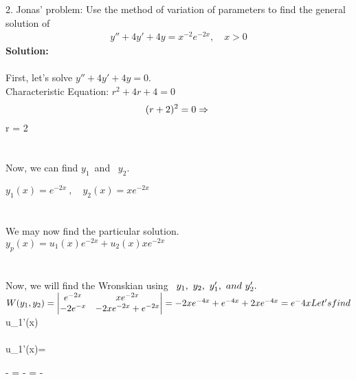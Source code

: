\documentclass{article}
\begin{document}
\hline 
\vspace{0.2in}


2. Jonas' problem: Use the method of variation of parameters to find the general solution of
\begin{align*}
y'' + 4y' + 4y = x^{-2} e^{-2x}, \quad x > 0
\end{align*}
\textbf{Solution:} 
\\ \\
First, let's solve $y'' + 4y' + 4y = 0$.\\
\noindent Characteristic Equation: $ r^2 + 4r + 4 = 0$\\
\noindent \quad \Rightarrow $$(r+2)^2=0\\
\noindent \Rightarrow \ $$r = 2 \\ \\ \\

\noindent Now, we can find $y_1$\ and \ \mathrm $ y_2$. 


\noindent $y_1(x) = e^{-2x} \ , \quad y_2(x) = xe^{-2x} $\\  \\ \\

\noindent \mathrm We may now find the particular solution.\\ 
$y_p(x) = u_1(x)e^{-2x} + u_2(x)xe^{-2x}$ \\ \\ \\

\noindent Now, we will find the Wronskian using \ $y_1, \  y_2, \  y_1', \ 
\normalfont{and} \ y_2'.\\ \\
$$W(y_1,y_2) = \begin{vmatrix}
    e^{-2x} & xe^{-2x} \\
    -2e^{-x} & -2xe^{-2x} + e^{-2x} 
    \end{vmatrix}
= -2xe^{-4x} + e^{-4x} + 2xe^{-4x} = e^-4x \\ \\ \\

\noindent Let's find $ u_1'(x) \\ \\
$$u_1'(x)= {\Large - = - = -$$\par}\\ \\ \\
\end{document}
